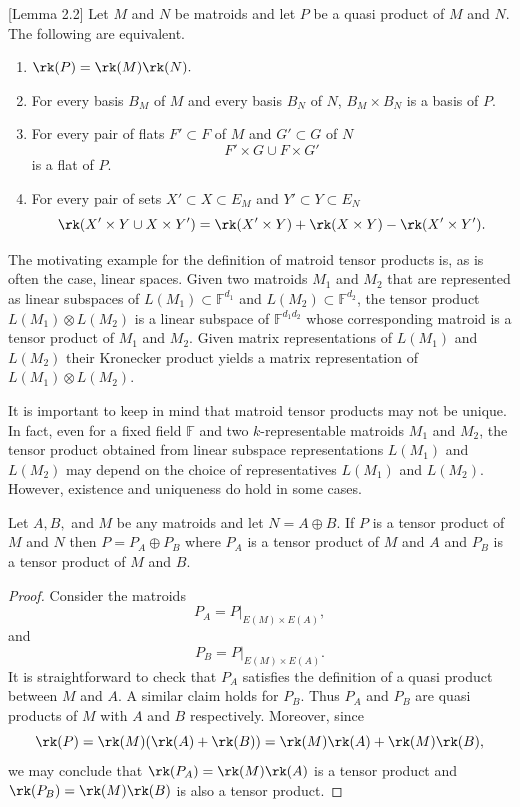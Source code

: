     \begin{lemma}\label{lem:tensorCharacterizations}\cite{LV81}[Lemma 2.2]
    Let $M$ and $N$ be matroids and let $P$ be a quasi product of $M$ and $N$. The following are equivalent.
    \begin{enumerate}
        \item $\rk(P)=\rk(M)\rk(N).$
        \item For every basis $B_M$ of $M$ and every basis $B_N$ of $N$, $B_M\times B_N$ is a basis of $P$.
        \item For every pair of flats $F'\subset F$ of $M$ and $G'\subset G$ of $N$ 
        $$F'\times G \cup F\times G'$$
        is a flat of $P$.
        \item For every pair of sets $X'\subset X\subset E_M$ and $Y'\subset Y\subset E_N$
        $$\rk(X'\times Y\cup X\times Y')= \rk(X'\times Y)+\rk(X\times Y)- \rk(X'\times Y').$$
    \end{enumerate}
    \end{lemma}
    
    The motivating example for the definition of matroid tensor products is, as is often the case, linear spaces. Given two matroids $M_1$ and $M_2$ that are represented as linear subspaces of $L(M_1)\subset \mathbb{F}^{d_1}$ and $L(M_2)\subset \mathbb{F}^{d_2}$, the tensor product $L(M_1)\otimes L(M_2)$ is a linear subspace of $\mathbb{F}^{d_1d_2}$ whose corresponding matroid is a tensor product of $M_1$ and $M_2$. Given matrix representations of $L(M_1)$ and $L(M_2)$ their Kronecker product yields a matrix representation of $L(M_1)\otimes L(M_2)$.
    
    It is important to keep in mind that matroid tensor products may not be unique. In fact, even for a fixed field $\mathbb{F}$ and two $k$-representable matroids $M_1$ and $M_2$, the tensor product obtained from linear subspace representations $L(M_1)$ and $L(M_2)$ may depend on the choice of representatives $L(M_1)$ and $L(M_2)$. However, existence and uniqueness do hold in some cases.
    \begin{lemma}\label{lem:tensorSums}
     Let $A,B,$ and $M$ be any matroids and let $N=A\oplus B$. If $P$ is a tensor product of $M$ and $N$ then $P= P_A\oplus P_B$ where $P_A$ is a tensor product of $M$ and $A$ and $P_B$ is a tensor product of $M$ and $B$.
    \end{lemma}
    \begin{proof}
        Consider the matroids 
        $$P_A = P|_{E(M)\times E(A)},$$
        and
        $$P_B = P|_{E(M)\times E(A)}.$$
        It is straightforward to check that $P_A$ satisfies the definition of a quasi product between $M$ and $A$. A similar claim holds for $P_B$. Thus $P_A$ and $P_B$ are quasi products of $M$ with $A$ and $B$ respectively. Moreover, since
        $$\rk(P)=\rk(M)(\rk(A)+\rk(B))=\rk(M)\rk(A)+\rk(M)\rk(B),$$
        we may conclude that $\rk(P_A)=\rk(M)\rk(A)$ is a tensor product and $\rk(P_B)= \rk(M)\rk(B)$ is also a tensor product. 
    \end{proof}


